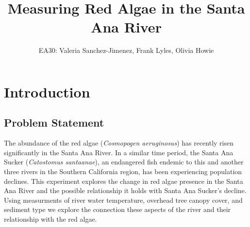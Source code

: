 \documentclass{article}
\title{Measuring Red Algae in the Santa Ana River}
\author{EA30: Valeria Sanchez-Jimenez, Frank Lyles, Olivia Howie}
\begin{document}



\maketitle

\newpage
\tableofcontents
\newpage

\section{Introduction}


\subsection{Problem Statement}

The abundance of the red algae (\emph{Cosmopogen aeruginosus}) has recently risen significantly in the Santa Ana River. In a similar time period, the Santa Ana Sucker (\emph{Catostomus santaanae}), an endangered fish endemic to this and another three rivers in the Southern California region, has been experiencing population declines. This experiment explores the change in red algae presence in the Santa Ana River and the possible relationship it holds with Santa Ana Sucker's decline. Using measurments of river water temperature, overhead tree canopy cover, and sediment type we explore the connection these aspects of the river and their relationship with the red algae.
\end{document}
